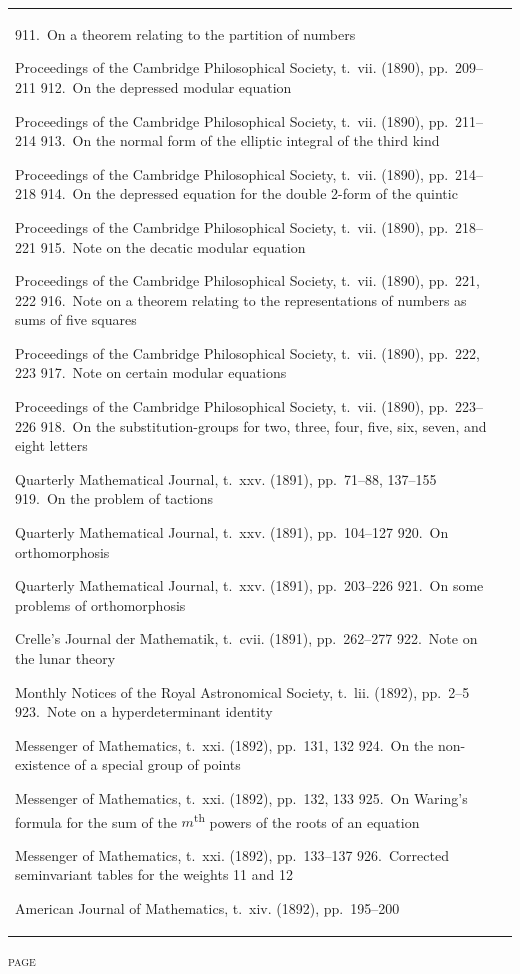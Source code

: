 \documentclass[11pt,a4paper]{book}
\providecommand{\paperentry}[3]{#1.\ #2\dotfill #3\par}
\begin{document}
\begin{center}
\begin{tabular}{p{4.2in}r}
\paperentry{911}{On a theorem relating to the partition of numbers}{84}{Proceedings of the Cambridge Philosophical Society, t.~vii. (1890), pp.~209--211}
\paperentry{912}{On the depressed modular equation}{86}{Proceedings of the Cambridge Philosophical Society, t.~vii. (1890), pp.~211--214}
\paperentry{913}{On the normal form of the elliptic integral of the third kind}{89}{Proceedings of the Cambridge Philosophical Society, t.~vii. (1890), pp.~214--218}
\paperentry{914}{On the depressed equation for the double 2-form of the quintic}{93}{Proceedings of the Cambridge Philosophical Society, t.~vii. (1890), pp.~218--221}
\paperentry{915}{Note on the decatic modular equation}{97}{Proceedings of the Cambridge Philosophical Society, t.~vii. (1890), pp.~221, 222}
\paperentry{916}{Note on a theorem relating to the representations of numbers as sums of five squares}{98}{Proceedings of the Cambridge Philosophical Society, t.~vii. (1890), pp.~222, 223}
\paperentry{917}{Note on certain modular equations}{100}{Proceedings of the Cambridge Philosophical Society, t.~vii. (1890), pp.~223--226}
\paperentry{918}{On the substitution-groups for two, three, four, five, six, seven, and eight letters}{117}{Quarterly Mathematical Journal, t.~xxv. (1891), pp.~71--88, 137--155}
\paperentry{919}{On the problem of tactions}{150}{Quarterly Mathematical Journal, t.~xxv. (1891), pp.~104--127}
\paperentry{920}{On orthomorphosis}{170}{Quarterly Mathematical Journal, t.~xxv. (1891), pp.~203--226}
\paperentry{921}{On some problems of orthomorphosis}{191}{Crelle's Journal der Mathematik, t.~cvii. (1891), pp.~262--277}
\paperentry{922}{Note on the lunar theory}{206}{Monthly Notices of the Royal Astronomical Society, t.~lii. (1892), pp.~2--5}
\paperentry{923}{Note on a hyperdeterminant identity}{210}{Messenger of Mathematics, t.~xxi. (1892), pp.~131, 132}
\paperentry{924}{On the non-existence of a special group of points}{212}{Messenger of Mathematics, t.~xxi. (1892), pp.~132, 133}
\paperentry{925}{On Waring's formula for the sum of the $m$\textsuperscript{th} powers of the roots of an equation}{213}{Messenger of Mathematics, t.~xxi. (1892), pp.~133--137}
\paperentry{926}{Corrected seminvariant tables for the weights 11 and 12}{217}{American Journal of Mathematics, t.~xiv. (1892), pp.~195--200}
\end{tabular}
\end{center}

\newpage
\thispagestyle{fancy}
\begin{center}
{\small\textsc{page}}
\end{center}
\vspace{-0.5em}
\end{document}
